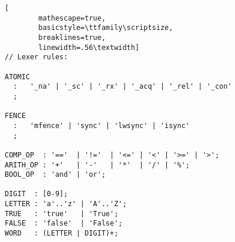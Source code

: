 \begin{multicols*}{2}
\begin{lstlisting}[
        mathescape=true,
        basicstyle=\ttfamily\scriptsize,
        breaklines=true,
        linewidth=.56\textwidth]
// Lexer rules:

ATOMIC
  :   '_na' | '_sc' | '_rx' | '_acq' | '_rel' | '_con'
  ;

FENCE
  :   'mfence' | 'sync' | 'lwsync' | 'isync'
  ;
    
COMP_OP  : '=='  | '!='  | '<=' | '<' | '>=' | '>';
ARITH_OP : '+'   | '-'   | '*'  | '/' | '%';
BOOL_OP  : 'and' | 'or';

DIGIT  : [0-9];
LETTER : 'a'..'z' | 'A'..'Z';
TRUE   : 'true'   | 'True';
FALSE  : 'false'  | 'False';
WORD   : (LETTER | DIGIT)+;
\end{lstlisting}
\end{multicols*}
